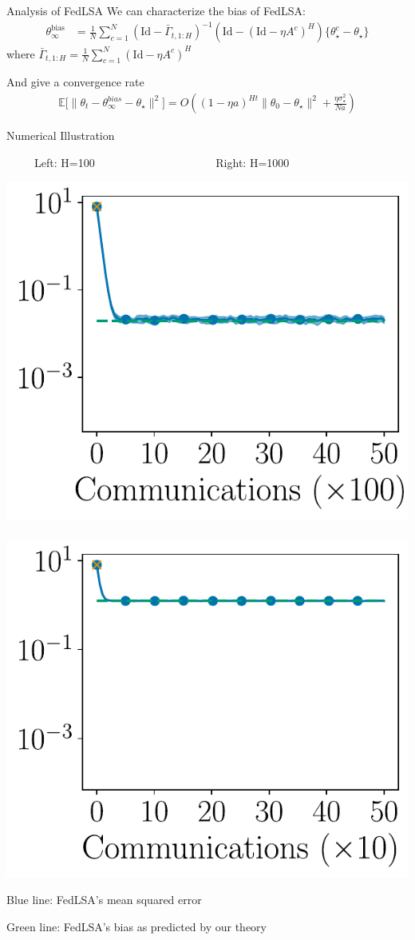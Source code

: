 \documentclass[aspectratio=169,14pt]{beamer}
\begin{document}
\begin{frame}{Analysis of FedLSA}
  We can characterize the bias of FedLSA:
  \begin{align*}
    \theta_\infty^{\text{bias}}
    & =
      \frac{1}{N}
      \sum_{c=1}^N
      (\text{Id} - \bar{\Gamma}_{t,1:H})^{-1} 
      (\text{Id} - (\text{Id}- \eta A^c)^H)\{ \theta_\star^c - \theta_\star \}
  \end{align*}
  where $\bar{\Gamma}_{t,1:H} = \tfrac{1}{N} \sum_{c=1}^N (\text{Id} - \eta A^c)^H$

  \pause

  \vspace{1em}
  
  And give a convergence rate
  \begin{align*}
    \mathbb{E} \Big[ \| {\theta_t - \theta^{bias}_{\infty} - \theta_\star} \|^2 \Big]
    =
    O\left(
    (1 - \eta a)^{H t} \| \theta_0 - \theta_\star \|^2
    + \frac{\eta \sigma_\star^2}{N a}
    \right)
  \end{align*}
\end{frame}


\begin{frame}{Numerical Illustration}
  \vspace{-0.5em}
  
  \begin{center}
    ~~~~~Left: H=100~~~~~~~~~~~~~~~~~~~~~
    Right: H=1000
 
    \vspace{-1em}
   
    \includegraphics[width=0.4\linewidth]{images/plot_hg_100_n100_fedlsa.pdf}
    ~~
    \includegraphics[width=0.4\linewidth]{images/plot_hg_1000_n100_fedlsa.pdf}
  \end{center}

  \vspace{-1em}

  Blue line: FedLSA's mean squared error

  \vspace{-1em}

  Green line: FedLSA's bias as predicted by our theory
\end{frame}
\end{document}
